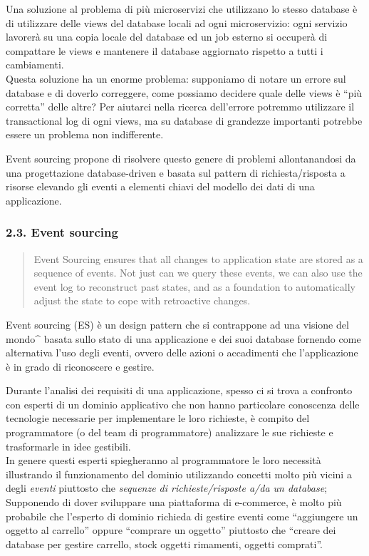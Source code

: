 \documentclass[]{article}
\begin{document}
Una soluzione al problema di più microservizi che utilizzano lo stesso
database è di utilizzare delle views del database locali ad ogni
microservizio: ogni servizio lavorerà su una copia locale del database
ed un job esterno si occuperà di compattare le views e mantenere il
database aggiornato rispetto a tutti i cambiamenti.\\
Questa soluzione ha un enorme problema: supponiamo di notare un errore
sul database e di doverlo correggere, come possiamo decidere quale delle
views è ``più corretta'' delle altre? Per aiutarci nella ricerca
dell'errore potremmo utilizzare il transactional log di ogni views, ma
su database di grandezze importanti potrebbe essere un problema non
indifferente.

Event sourcing propone di risolvere questo genere di problemi
allontanandosi da una progettazione database-driven e basata sul pattern
di richiesta/risposta a risorse elevando gli eventi a elementi chiavi
del modello dei dati di una applicazione.

\newpage

\hypertarget{event-sourcing}{\subsubsection{2.3. Event
sourcing}\label{event-sourcing}}

\begin{quote}
Event Sourcing ensures that all changes to application state are stored
as a sequence of events. Not just can we query these events, we can also
use the event log to reconstruct past states, and as a foundation to
automatically adjust the state to cope with retroactive changes.
\end{quote}

Event sourcing (ES) è un design pattern che si contrappone ad una
visione del mondo\^{} basata sullo stato di una applicazione e dei suoi
database fornendo come alternativa l'uso degli eventi, ovvero delle
azioni o accadimenti che l'applicazione è in grado di riconoscere e
gestire.

Durante l'analisi dei requisiti di una applicazione, spesso ci si trova
a confronto con esperti di un dominio applicativo che non hanno
particolare conoscenza delle tecnologie necessarie per implementare le
loro richieste, è compito del programmatore (o del team di
programmatore) analizzare le sue richieste e trasformarle in idee
gestibili.\\
In genere questi esperti spiegheranno al programmatore le loro necessità
illustrando il funzionamento del dominio utilizzando concetti molto più
vicini a degli \emph{eventi} piuttosto che \emph{sequenze di
richieste/risposte a/da un database}; Supponendo di dover sviluppare una
piattaforma di e-commerce, è molto più probabile che l'esperto di
dominio richieda di gestire eventi come ``aggiungere un oggetto al
carrello'' oppure ``comprare un oggetto'' piuttosto che ``creare dei
database per gestire carrello, stock oggetti rimamenti, oggetti
comprati''.
\end{document}
